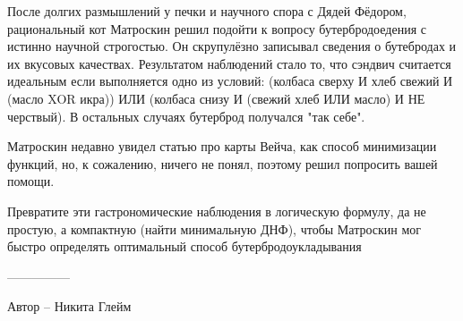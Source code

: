 \question
После долгих размышлений у печки и научного спора с Дядей Фёдором, рациональный кот Матроскин решил подойти к вопросу бутербродоедения с истинно научной строгостью. Он скрупулёзно записывал сведения о бутебродах и их вкусовых качествах. Результатом наблюдений стало то, что сэндвич считается идеальным если выполняется одно из условий: (колбаса сверху И хлеб свежий И (масло XOR икра)) ИЛИ (колбаса снизу И (свежий хлеб ИЛИ масло) И НЕ черствый). В остальных случаях бутерброд получался "так себе". 

Матроскин недавно увидел статью про карты Вейча, как способ минимизации функций, но, к сожалению, ничего не понял, поэтому решил попросить вашей помощи.

Превратите эти гастрономические наблюдения в логическую формулу, да не простую, а компактную (найти минимальную ДНФ), чтобы Матроскин мог быстро определять оптимальный способ бутербродоукладывания

---------------

Автор -- Никита Глейм
